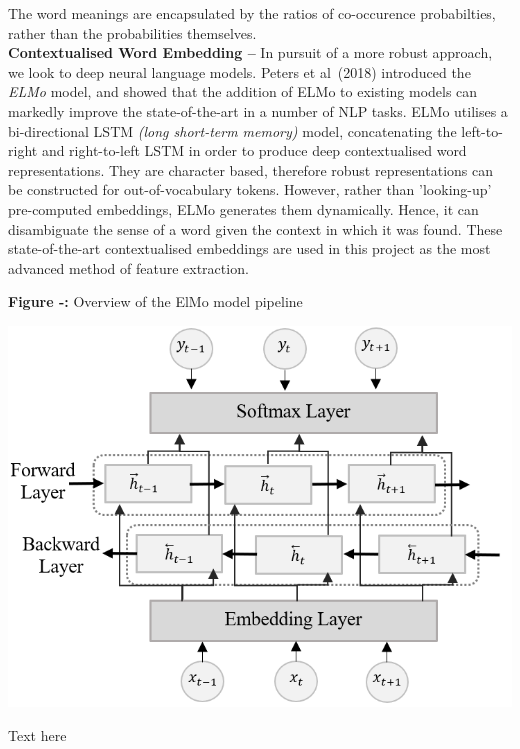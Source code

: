 \documentclass[12pt,a4paper]{article}
\begin{document}
The word meanings are encapsulated by the ratios of co-occurence probabilties, rather than the probabilities themselves.\\


\noindent \textbf{Contextualised Word Embedding --}
In pursuit of a more robust approach, we look to deep neural language models. Peters et al\ (2018) \cite{peters2018deep} introduced the \textit{ELMo} model, and showed that the addition of ELMo to existing models can markedly improve the state-of-the-art in a number of NLP tasks. ELMo utilises a bi-directional LSTM \textit{(long short-term memory)} model, concatenating the left-to-right and right-to-left LSTM in order to produce deep contextualised word representations. They are character based, therefore robust representations can be constructed for out-of-vocabulary tokens. However, rather than 'looking-up' pre-computed embeddings, ELMo generates them dynamically. Hence, it can disambiguate the sense of a word given the context in which it was found. These state-of-the-art contextualised embeddings are used in this project as the most advanced method of feature extraction.\\

\begin{minipage}{0.45\textwidth}
	\begin{center}
		\textbf{Figure -:} Overview of the ElMo model pipeline
	\end{center}
	\begin{center}
		\includegraphics[width=1\textwidth]{Images/elmo_diagram.png}
		\label{ElMo Model}
	\end{center}
\end{minipage} \hfill
\begin{minipage}{0.5\textwidth}
	Text here
\end{minipage}
\end{document}
